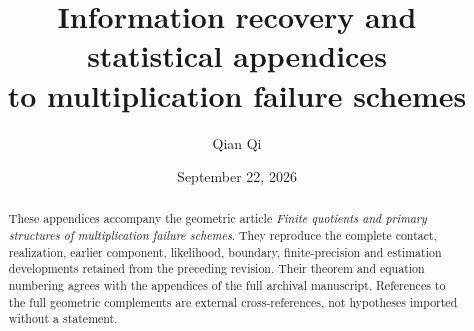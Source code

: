 \documentclass[11pt,reqno]{amsart}
\title[Information recovery and statistical appendices]{Information recovery and statistical appendices\\to multiplication failure schemes}
\author{Qian Qi}
\date{September 22, 2026}
\numberwithin{equation}{section}
\theoremstyle{definition}\newtheorem{definition}[theorem]{Definition}
\theoremstyle{remark}\newtheorem{remark}[theorem]{Remark}
\begin{document}
\begin{abstract}
These appendices accompany the geometric article \emph{Finite quotients
and primary structures of multiplication failure schemes}. They reproduce the
complete contact, realization, earlier component, likelihood, boundary,
finite-precision and estimation developments retained from the preceding
revision. Their theorem and equation numbering agrees with the appendices
of the full archival manuscript. References to the full geometric complements are
external cross-references, not hypotheses imported without a statement.
\end{abstract}
\maketitle
\appendix









\end{document}
